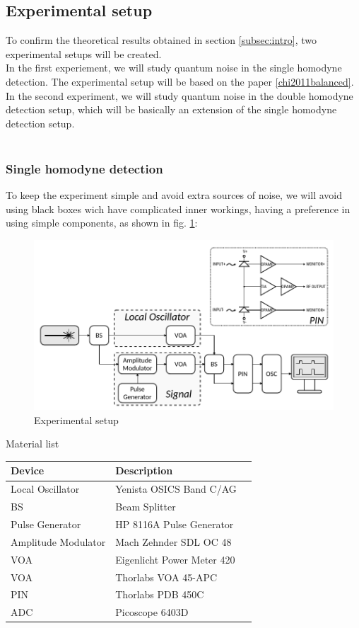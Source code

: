 \subsection{Experimental setup}
%
To confirm the theoretical results obtained in section \ref{subsec:intro}, two experimental setups will be created.\\
In the first experiement, we will study quantum noise in the single homodyne detection. The experimental setup will be based on the paper \ref{chi2011balanced}.\\
In the second experiment, we will study quantum noise in the double homodyne detection setup, which will be basically an extension of the single homodyne detection setup.\\
\\
\subsubsection{Single homodyne detection}
%
To keep the experiment simple and avoid extra sources of noise, we will avoid using black boxes wich have complicated inner workings, having a preference in using simple components, as shown in fig. \ref{fig:experimental_homodyne_setup}:
\\
\begin{figure}[H]
	\centering
	\includegraphics{./sdf/quantum_noise/figures/scheme_experimental.pdf}
	\caption{Experimental setup}
	\label{fig:experimental_homodyne_setup}
\end{figure}
%
%
Material list
\begin{table}[H]
	\centering
	\begin{tabulary}{1.0\textwidth}{|L|L|l|}
		\hline
		\textbf{Device}		& \textbf{Description}\\
		\hline
		Local Oscillator	& Yenista OSICS Band C/AG\\
		\hline
		BS					& Beam Splitter\\
		\hline
		Pulse Generator		& HP 8116A Pulse Generator\\
		\hline
		Amplitude Modulator	& Mach Zehnder SDL OC 48\\
		\hline
		VOA					& Eigenlicht Power Meter 420\\
		\hline
		VOA					& Thorlabs VOA 45-APC\\
		\hline
		PIN					& Thorlabs PDB 450C\\
		\hline
		ADC					& Picoscope 6403D\\
		\hline
	\end{tabulary}
\end{table}
